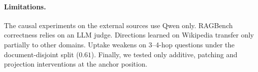 \paragraph{Limitations.}
The causal experiments on the external sources use Qwen only. RAGBench correctness relies on an LLM judge. Directions learned on Wikipedia transfer only partially to other domains. Uptake weakens on 3--4-hop questions under the document-disjoint split ($0.61$). Finally, we tested only additive, patching and projection interventions at the anchor position.
